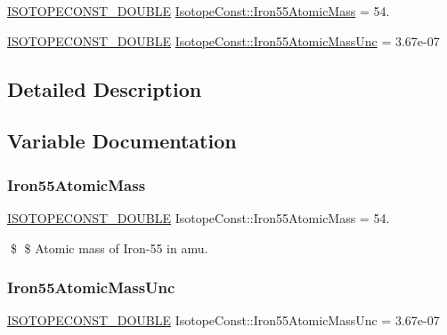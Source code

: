 \begin{DoxyCompactItemize}
\item 
\mbox{\hyperlink{group___isotope_const-_macros_ga8f45a7272ce02c0b4c65c44636ed719a}{I\+S\+O\+T\+O\+P\+E\+C\+O\+N\+S\+T\+\_\+\+D\+O\+U\+B\+LE}} \mbox{\hyperlink{group___isotope_const-_iron-_fe55_ga42a7d2b2185adad74540488213d38388}{Isotope\+Const\+::\+Iron55\+Atomic\+Mass}} = 54.
\item 
\mbox{\hyperlink{group___isotope_const-_macros_ga8f45a7272ce02c0b4c65c44636ed719a}{I\+S\+O\+T\+O\+P\+E\+C\+O\+N\+S\+T\+\_\+\+D\+O\+U\+B\+LE}} \mbox{\hyperlink{group___isotope_const-_iron-_fe55_ga06fde94d2fe1628b86af2dcc29a34b5c}{Isotope\+Const\+::\+Iron55\+Atomic\+Mass\+Unc}} = 3.\+67e-\/07
\end{DoxyCompactItemize}


\subsection{Detailed Description}


\subsection{Variable Documentation}
\mbox{\label{group___isotope_const-_iron-_fe55_ga42a7d2b2185adad74540488213d38388}} 
\subsubsection{\texorpdfstring{Iron55\+Atomic\+Mass}{Iron55AtomicMass}}
{\footnotesize\ttfamily \mbox{\hyperlink{group___isotope_const-_macros_ga8f45a7272ce02c0b4c65c44636ed719a}{I\+S\+O\+T\+O\+P\+E\+C\+O\+N\+S\+T\+\_\+\+D\+O\+U\+B\+LE}} Isotope\+Const\+::\+Iron55\+Atomic\+Mass = 54.}

\$ \$ Atomic mass of Iron-\/55 in amu. \mbox{\label{group___isotope_const-_iron-_fe55_ga06fde94d2fe1628b86af2dcc29a34b5c}} 
\subsubsection{\texorpdfstring{Iron55\+Atomic\+Mass\+Unc}{Iron55AtomicMassUnc}}
{\footnotesize\ttfamily \mbox{\hyperlink{group___isotope_const-_macros_ga8f45a7272ce02c0b4c65c44636ed719a}{I\+S\+O\+T\+O\+P\+E\+C\+O\+N\+S\+T\+\_\+\+D\+O\+U\+B\+LE}} Isotope\+Const\+::\+Iron55\+Atomic\+Mass\+Unc = 3.\+67e-\/07}

